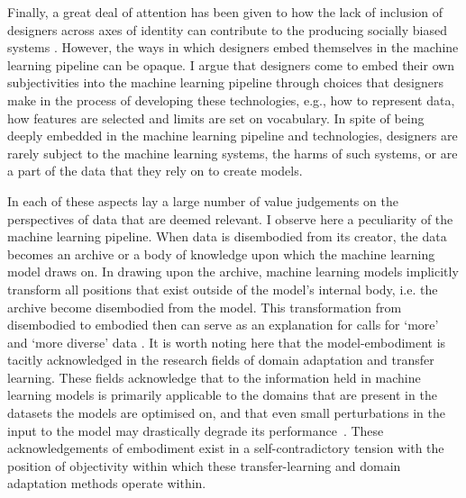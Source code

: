 {Finally, a great deal of attention has been given to how the lack of inclusion of designers across axes of identity can contribute to the producing socially biased systems \citep{West:2019,Holstein:2019}.
However, the ways in which designers embed themselves in the machine learning pipeline can be opaque.
I argue that designers come to embed their own subjectivities into the machine learning pipeline through choices that designers make in the process of developing these technologies, e.g., how to represent data, how features are selected and limits are set on vocabulary.
In spite of being deeply embedded in the machine learning pipeline and technologies, designers are rarely subject to the machine learning systems, the harms of such systems, or are a part of the data that they rely on to create models.

In each of these aspects lay a large number of value judgements on the perspectives of data that are deemed relevant.
I observe here a peculiarity of the machine learning pipeline.
When data is disembodied from its creator, the data becomes an archive or a body of knowledge upon which the machine learning model draws on.
In drawing upon the archive, machine learning models implicitly transform all positions that exist outside of the model's internal body, i.e. the archive become disembodied from the model.
This transformation from disembodied to embodied then can serve as an explanation for calls for `more' and `more diverse' data \citep{Holstein:2019}.
It is worth noting here that the model-embodiment is tacitly acknowledged in the research fields of domain adaptation \citep{Daume:2007} and transfer learning.
These fields acknowledge that to the information held in machine learning models is primarily applicable to the domains that are present in the datasets the models are optimised on, and that even small perturbations in the input to the model may drastically degrade its performance~\citep{Szegedy:2014,Daume:2007}.
These acknowledgements of embodiment exist in a self-contradictory tension with the position of objectivity within which these transfer-learning and domain adaptation methods operate within.


}
